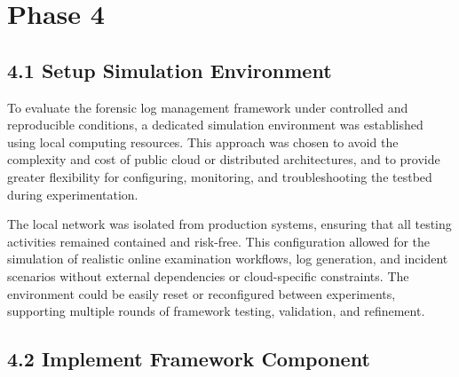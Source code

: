 \section{Phase 4}
\subsection{4.1 Setup Simulation Environment}
To evaluate the forensic log management framework under controlled and reproducible conditions, a dedicated simulation environment was established using local computing resources. This approach was chosen to avoid the complexity and cost of public cloud or distributed architectures, and to provide greater flexibility for configuring, monitoring, and troubleshooting the testbed during experimentation.

The local network was isolated from production systems, ensuring that all testing activities remained contained and risk-free. This configuration allowed for the simulation of realistic online examination workflows, log generation, and incident scenarios without external dependencies or cloud-specific constraints. The environment could be easily reset or reconfigured between experiments, supporting multiple rounds of framework testing, validation, and refinement.


\subsection{4.2 Implement Framework Component}
